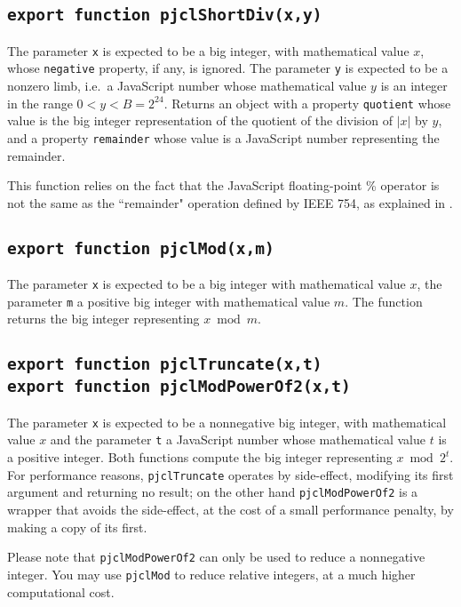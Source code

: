 \documentclass[12pt]{article}
\begin{document}
\subsection{\tt export function pjclShortDiv(x,y)}

The parameter {\tt x} is expected to be a big integer, with
mathematical value $x$, whose {\tt negative} property, if any, is ignored.  The parameter {\tt y}
is expected to be a nonzero limb, i.e.\ a JavaScript number
whose mathematical value $y$ is an integer in the range $0 < y < B = 2^{24}$.  Returns an object
with a property {\tt quotient} whose value is the big integer
representation of the quotient of the division of $|x|$ by $y$, and a
property {\tt remainder} whose value is a JavaScript number representing the remainder.

This function relies on the fact that the JavaScript floating-point \% operator is not the same as the ``remainder" operation defined by IEEE 754, as explained in \cite[\S11.5.3]{ecmascript51}.

\subsection{\tt export function pjclMod(x,m)}

The parameter {\tt x} is expected to be a big integer with
mathematical value $x$, the parameter {\tt m} a positive big integer
with mathematical value $m$.  The function returns the big integer
representing $x \bmod m$.

\subsection{\tt export function pjclTruncate(x,t)\\export function pjclModPowerOf2(x,t)}

The parameter {\tt x} is expected to be a nonnegative big integer,
with mathematical value $x$ and the parameter {\tt t} 
a JavaScript number whose mathematical value $t$ is a positive
integer.  Both functions compute the big integer representing $x \bmod
2^t$.  For performance reasons, {\tt pjclTruncate} operates by side-effect, modifying its first argument and returning no result; on the other hand {\tt pjclModPowerOf2} is a wrapper that avoids the side-effect, at the cost of a small performance penalty, by making a copy of its first.

Please note that {\tt pjclModPowerOf2} can only be used to reduce a nonnegative integer.  You may use {\tt pjclMod} to reduce relative integers, at a much higher computational cost.
\end{document}
